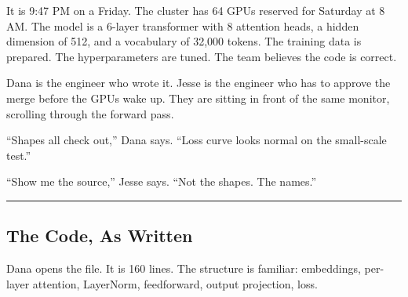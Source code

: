 \documentclass[11pt,]{article}
\begin{document}
It is 9:47 PM on a Friday. The cluster has 64 GPUs reserved for Saturday
at 8 AM. The model is a 6-layer transformer with 8 attention heads, a
hidden dimension of 512, and a vocabulary of 32,000 tokens. The training
data is prepared. The hyperparameters are tuned. The team believes the
code is correct.

Dana is the engineer who wrote it. Jesse is the engineer who has to
approve the merge before the GPUs wake up. They are sitting in front of
the same monitor, scrolling through the forward pass.

``Shapes all check out,'' Dana says. ``Loss curve looks normal on the
small-scale test.''

``Show me the source,'' Jesse says. ``Not the shapes. The names.''

\begin{center}\rule{0.5\linewidth}{0.4pt}\end{center}

\hypertarget{the-code-as-written}{%
\subsection{The Code, As Written}\label{the-code-as-written}}

Dana opens the file. It is 160 lines. The structure is familiar:
embeddings, per-layer attention, LayerNorm, feedforward, output
projection, loss.
\end{document}
